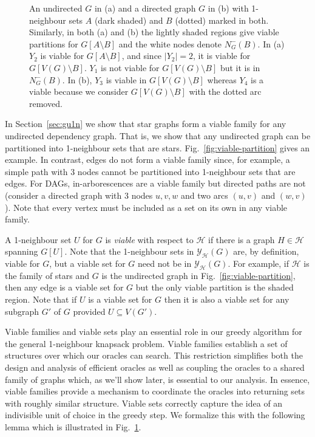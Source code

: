 \documentclass[12pt]{article}
\begin{document}
\begin{figure}[tb]
\centering
{}
\caption{ \label{fig:viable-partition-lemma}  An undirected $G$ in (a) and a directed graph $G$ in (b) with 1-neighbour sets $A$ (dark shaded) and $B$ (dotted) marked in both.  Similarly, in both (a) and (b) the lightly shaded regions give viable partitions for $G[A \setminus B]$ and the white nodes denote $N^{-}_{G}(B)$.  In (a) $Y_{2}$ is viable for $G[A \setminus B]$, and since $|Y_{2}|=2$, it is viable for $G[V(G) \setminus B]$.  $Y_{1}$ is not viable for $G[V(G) \setminus B]$ but it is in $N^{-}_{G}(B)$.  In (b), $Y_{3}$ is viable in $G[V(G) \setminus B]$ whereas $Y_{4}$ is a viable because we consider $G[V(G) \setminus B]$ with the dotted arc removed.}
\end{figure}

In Section~\ref{sec:gu1n} we show that star graphs form a viable
family for any undirected dependency graph.  That is, we show that any
undirected graph can be partitioned into 1-neighbour sets that are
stars.  Fig.~\ref{fig:viable-partition} gives an example.  In
contrast, edges do not form a viable family since, for example, a
simple path with 3 nodes cannot be partitioned into 1-neighbour sets
that are edges.  For DAGs, in-arborescences are a viable family  but
directed paths are not  (consider a directed graph with 3 nodes
$u,v,w$ and two arcs $(u,v)$ and $(w,v)$).  Note that every vertex
must be included as a set on its own in any viable family.

A 1-neighbour set $U$ for $G$ is {\em viable} with respect to $\mathcal{H}$ if there is a graph $H \in \mathcal{H}$ spanning $G[U]$. Note that the 1-neighbour sets in $\mathcal{Y}_{\mathcal{H}}(G)$ are, by definition, viable for $G$, but a viable set for $G$ need not be in $\mathcal{Y}_{\mathcal{H}}(G)$.  For example, if $\mathcal{H}$ is the family of stars and $G$ is the undirected graph in Fig.~\ref{fig:viable-partition}, then any edge is a viable set for $G$ but the only viable partition is the shaded region.  Note that if $U$ is a viable set for $G$ then it is also a viable set for any subgraph $G'$ of $G$ provided $U \subseteq V(G')$.







Viable families and viable sets play an essential role in our greedy algorithm for the general 1-neighbour knapsack problem.  Viable families establish a set of structures over which our oracles can search.  This restriction simplifies both the design and analysis of efficient oracles as well as coupling the oracles to a shared family of graphs which, as we'll show later, is essential to our analysis.  In essence, viable families provide a mechanism to coordinate the oracles into returning sets with roughly similar structure.  Viable sets correctly capture the idea of an indivisible unit of choice in the greedy step.  We formalize this with the following lemma which is illustrated in Fig.~\ref{fig:viable-partition-lemma}.
\end{document}
